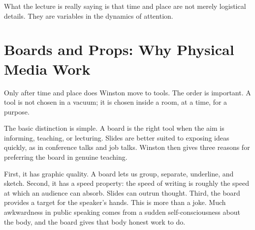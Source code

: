 \begin{figure}[h]
\centering
{}
\end{figure}

What the lecture is really saying is that time and place are not merely logistical details. They are variables in the dynamics of attention.

\section{Boards and Props: Why Physical Media Work}

Only after time and place does Winston move to tools. The order is important. A tool is not chosen in a vacuum; it is chosen inside a room, at a time, for a purpose.

The basic distinction is simple. A board is the right tool when the aim is informing, teaching, or lecturing. Slides are better suited to exposing ideas quickly, as in conference talks and job talks. Winston then gives three reasons for preferring the board in genuine teaching.

First, it has graphic quality. A board lets us group, separate, underline, and sketch. Second, it has a speed property: the speed of writing is roughly the speed at which an audience can absorb. Slides can outrun thought. Third, the board provides a target for the speaker's hands. This is more than a joke. Much awkwardness in public speaking comes from a sudden self-consciousness about the body, and the board gives that body honest work to do.


